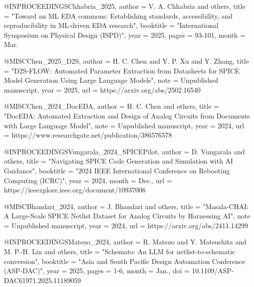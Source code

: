 \documentclass[conference]{IEEEtran}
\begin{document}
\begin{thebibliography}

@INPROCEEDINGS{Chhabria_2025,
    author      =   {V. A. {Chhabria} and others},
    title       =   "{Toward an {ML} {EDA} commons: Establishing standards, accessibility, and reproducibility in {ML}-driven {EDA} research}",
    booktitle   =   "{International Symposium on Physical Design (ISPD)}",
    year        =   {2025},
    pages       =   {93-101},
    month       =   {Mar.}
}

@MISC{Chen_2025_D2S,
    author      =   {H. C. {Chen} and Y. P. {Xu} and Y. {Zhang}},
    title       =   "{D2S-FLOW: Automated Parameter Extraction from Datasheets for {SPICE} Model Generation Using Large Language Models}",
    note        =   {Unpublished manuscript},
    year        =   {2025},
    url         =   {https://arxiv.org/abs/2502.16540}
}

@MISC{Chen_2024_DocEDA,
    author      =   {H. C. {Chen} and others},
    title       =   "{DocEDA: Automated Extraction and Design of Analog Circuits from Documents with Large Language Model}",
    note        =   {Unpublished manuscript},
    year        =   {2024},
    url         =   {https://www.researchgate.net/publication/386576578}
}

@INPROCEEDINGS{Vungarala_2024_SPICEPilot,
    author      =   {D. {Vungarala} and others},
    title       =   "{Navigating {SPICE} Code Generation and Simulation with {AI} Guidance}",
    booktitle   =   "{2024 IEEE International Conference on Rebooting Computing (ICRC)}",
    year        =   {2024},
    month       =   {Dec.},
    url         =   {https://ieeexplore.ieee.org/document/10937006}
}

@MISC{Bhandari_2024,
    author      =   {J. {Bhandari} and others},
    title       =   "{Masala-CHAI: A Large-Scale {SPICE} Netlist Dataset for Analog Circuits by Harnessing {AI}}",
    note        =   {Unpublished manuscript},
    year        =   {2024},
    url         =   {https://arxiv.org/abs/2411.14299}
}

@INPROCEEDINGS{Matsuo_2024,
    author      =   {R. {Matsuo} and Y. {Matsushita} and M. P.-H. {Lin} and others},
    title       =   "{Schemato: An {LLM} for netlist-to-schematic conversion}",
    booktitle   =   "{Asia and South Pacific Design Automation Conference (ASP-DAC)}",
    year        =   {2025},
    pages       =   {1-6},
    month       =   {Jan.},
    doi         =   {10.1109/ASP-DAC61971.2025.11189059}
}


\end{thebibliography}
\end{document}
